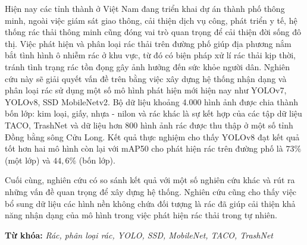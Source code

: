 \documentclass[./thesis.tex]{subfiles}
\begin{document}

{\fontsize{13}{12} \selectfont

Hiện nay các tỉnh thành ở Việt Nam đang triển khai dự án thành phố thông minh, ngoài việc giám sát giao thông, cải thiện dịch vụ công, phát triển y tế, hệ thống rác thải thông minh cũng đóng vai trò quan trọng để cải thiện đời sống đô thị.
Việc phát hiện và phân loại rác thải trên đường phố giúp địa phương nắm bắt tình hình ô nhiễm rác ở khu vực, từ đó có biện pháp xử lí rác thải kịp thời, tránh tình trạng rác tồn đọng gây ảnh hưởng đến sức khỏe người dân.
Nghiên cứu này sẽ giải quyết vấn đề trên bằng việc xây dựng hệ thống nhận dạng và phân loại rác sử dụng một số mô hình phát hiện mới hiện nay như YOLOv7, YOLOv8, SSD MobileNetv2.
Bộ dữ liệu khoảng 4.000 hình ảnh được chia thành bốn lớp: kim loại, giấy, nhựa - nilon và rác khác là sự kết hợp của các tập dữ liệu TACO, TrashNet và dữ liệu hơn 800 hình ảnh rác được thu thập ở một số tỉnh Đồng bằng sông Cửu Long.
Kết quả thực nghiệm cho thấy YOLOv8 đạt kết quả tốt hơn hai mô hình còn lại với mAP50 cho phát hiện rác trên đường phố là $73\%$ (một lớp) và $44,6\%$ (bốn lớp).

}

\bigskip

{\fontsize{13}{12} \selectfont
Cuối cùng, nghiên cứu có so sánh kết quả với một số nghiên cứu khác và rút ra những vấn đề quan trọng để xây dựng hệ thống.
Nghiên cứu cũng cho thấy việc bổ sung dữ liệu các hình nền không chứa đối tượng là rác đã giúp cải thiện khả năng nhận dạng của mô hình trong việc phát hiện rác thải trong tự nhiên.

}
\bigskip



{\bf Từ khóa:} \textit{Rác, phân loại rác, YOLO, SSD, MobileNet, TACO, TrashNet}
\end{document}
